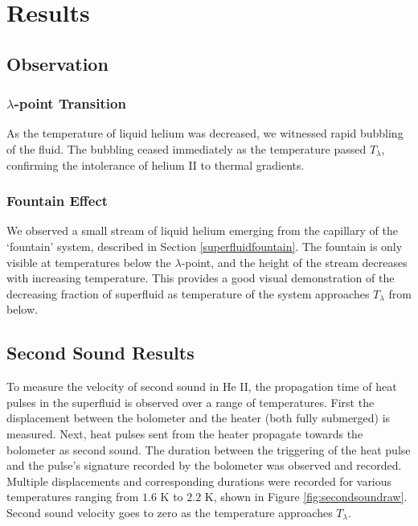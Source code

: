 
\section{Results}
\label{results}

\subsection{Observation}
\subsubsection{$\lambda$-point Transition}
As the temperature of liquid helium was decreased, we witnessed rapid
bubbling of the fluid. The bubbling ceased immediately as the
temperature passed $T_{\lambda}$, confirming the intolerance of helium
II to thermal gradients.

\subsubsection{Fountain Effect}
We observed a small stream of liquid helium emerging from the
capillary of the `fountain' system, described in Section
\ref{superfluidfountain}. The fountain is only visible at temperatures
below the $\lambda$-point, and the height of the stream decreases with
increasing temperature. This provides a good visual demonstration of
the decreasing fraction of superfluid as temperature of the system
approaches $T_{\lambda}$ from below.

\subsection{Second Sound Results}
\label{secondsoundresults}

To measure the velocity of second sound in He II, the propagation time of heat pulses in the superfluid is observed over a range of temperatures. First the displacement between the bolometer and the heater (both fully submerged) is measured. Next, heat pulses sent from the heater propagate towards the bolometer as second sound. The duration between the triggering of the heat pulse and the pulse's signature recorded by the bolometer was observed and recorded. Multiple displacements and corresponding durations were recorded for various temperatures ranging from $1.6$ K to $2.2$ K, shown in Figure \ref{fig:secondsoundraw}. Second sound velocity goes to zero as the temperature approaches $T_{\lambda}$.


